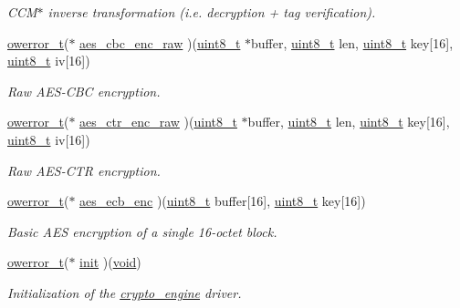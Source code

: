 \begin{DoxyCompactItemize}
\begin{DoxyCompactList}\small\item\em C\+C\+M$\ast$ inverse transformation (i.\+e. decryption + tag verification). \end{DoxyCompactList}\item 
\hyperlink{opendefs_8h_af20b7c3ed9d2ba19e56a309ad9314803}{owerror\+\_\+t}($\ast$ \hyperlink{structcrypto__engine_a2c1020b26e36e4532359deabc8176658}{aes\+\_\+cbc\+\_\+enc\+\_\+raw} )(\hyperlink{_p_e___types_8h_aba7bc1797add20fe3efdf37ced1182c5}{uint8\+\_\+t} $\ast$buffer, \hyperlink{_p_e___types_8h_aba7bc1797add20fe3efdf37ced1182c5}{uint8\+\_\+t} len, \hyperlink{_p_e___types_8h_aba7bc1797add20fe3efdf37ced1182c5}{uint8\+\_\+t} key\mbox{[}16\mbox{]}, \hyperlink{_p_e___types_8h_aba7bc1797add20fe3efdf37ced1182c5}{uint8\+\_\+t} iv\mbox{[}16\mbox{]})
\begin{DoxyCompactList}\small\item\em Raw A\+E\+S-\/\+C\+BC encryption. \end{DoxyCompactList}\item 
\hyperlink{opendefs_8h_af20b7c3ed9d2ba19e56a309ad9314803}{owerror\+\_\+t}($\ast$ \hyperlink{structcrypto__engine_a2d7b74d2af4e83b486d6682bd0f09ba1}{aes\+\_\+ctr\+\_\+enc\+\_\+raw} )(\hyperlink{_p_e___types_8h_aba7bc1797add20fe3efdf37ced1182c5}{uint8\+\_\+t} $\ast$buffer, \hyperlink{_p_e___types_8h_aba7bc1797add20fe3efdf37ced1182c5}{uint8\+\_\+t} len, \hyperlink{_p_e___types_8h_aba7bc1797add20fe3efdf37ced1182c5}{uint8\+\_\+t} key\mbox{[}16\mbox{]}, \hyperlink{_p_e___types_8h_aba7bc1797add20fe3efdf37ced1182c5}{uint8\+\_\+t} iv\mbox{[}16\mbox{]})
\begin{DoxyCompactList}\small\item\em Raw A\+E\+S-\/\+C\+TR encryption. \end{DoxyCompactList}\item 
\hyperlink{opendefs_8h_af20b7c3ed9d2ba19e56a309ad9314803}{owerror\+\_\+t}($\ast$ \hyperlink{structcrypto__engine_af79cfc9b02e07d4aa734331f523799ae}{aes\+\_\+ecb\+\_\+enc} )(\hyperlink{_p_e___types_8h_aba7bc1797add20fe3efdf37ced1182c5}{uint8\+\_\+t} buffer\mbox{[}16\mbox{]}, \hyperlink{_p_e___types_8h_aba7bc1797add20fe3efdf37ced1182c5}{uint8\+\_\+t} key\mbox{[}16\mbox{]})
\begin{DoxyCompactList}\small\item\em Basic A\+ES encryption of a single 16-\/octet block. \end{DoxyCompactList}\item 
\hyperlink{opendefs_8h_af20b7c3ed9d2ba19e56a309ad9314803}{owerror\+\_\+t}($\ast$ \hyperlink{structcrypto__engine_a48d162aefae127c892927fec6e6a8f38}{init} )(\hyperlink{usb__devapi_8h_afabf60e7f57651d6d595a02c75f07cd0}{void})
\begin{DoxyCompactList}\small\item\em Initialization of the \hyperlink{structcrypto__engine}{crypto\+\_\+engine} driver. \end{DoxyCompactList}\end{DoxyCompactItemize}


